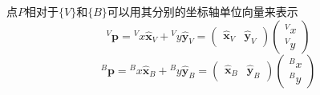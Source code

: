 \documentclass[UTF8,a4paper,10pt]{ctexart}
\begin{document}
点$P$相对于$\{V\}$和$\{B\}$可以用其分别的坐标轴单位向量来表示
\begin{equation}\label{eq:pV}
  {}^V\mathbf{p}={}^Vx\hat{\mathbf{x}}_V + {}^Vy\hat{\mathbf{y}}_V =
  \begin{pmatrix}\hat{\mathbf{x}}_V&\hat{\mathbf{y}}_V\end{pmatrix}
  \begin{pmatrix}{}^Vx\\{}^Vy\end{pmatrix}
\end{equation}
\begin{equation}\label{eq:pB}
  {}^B\mathbf{p}={}^Bx\hat{\mathbf{x}}_B + {}^By\hat{\mathbf{y}}_B =
  \begin{pmatrix}\hat{\mathbf{x}}_B&\hat{\mathbf{y}}_B\end{pmatrix}
  \begin{pmatrix}{}^Bx\\{}^By\end{pmatrix}
\end{equation}
\end{document}
